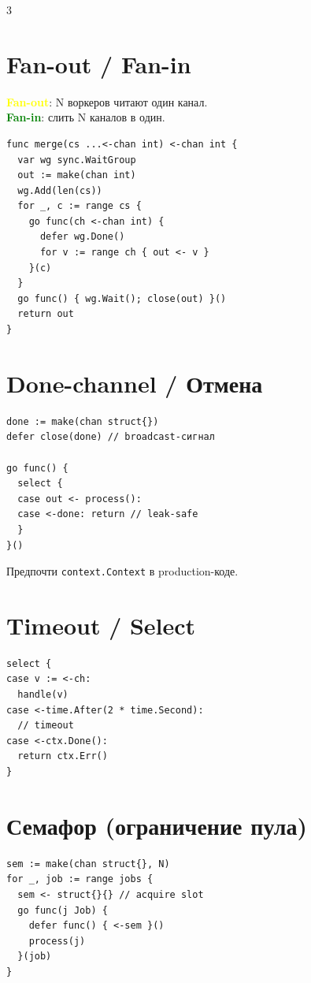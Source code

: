 \documentclass[8.5pt,a4paper]{article}
\newcommand{\hl}[2]{\textbf{\textcolor{#1}{#2}}}
\newcommand{\note}[1]{{\fontsize{6.5}{8}\color{muted} #1}}
\begin{document}
\begin{multicols}{3}
\section{Fan-out / Fan-in}

\hl{yellow}{Fan-out}: N воркеров читают один канал.\\
\hl{green}{Fan-in}: слить N каналов в один.
\begin{lstlisting}
func merge(cs ...<-chan int) <-chan int {
  var wg sync.WaitGroup
  out := make(chan int)
  wg.Add(len(cs))
  for _, c := range cs {
    go func(ch <-chan int) {
      defer wg.Done()
      for v := range ch { out <- v }
    }(c)
  }
  go func() { wg.Wait(); close(out) }()
  return out
}
\end{lstlisting}

\section{Done-channel / Отмена}

\begin{lstlisting}
done := make(chan struct{})
defer close(done) // broadcast-сигнал

go func() {
  select {
  case out <- process():
  case <-done: return // leak-safe
  }
}()
\end{lstlisting}

\note{Предпочти \texttt{context.Context} в production-коде.}

\section{Timeout / Select}

\begin{lstlisting}
select {
case v := <-ch:
  handle(v)
case <-time.After(2 * time.Second):
  // timeout
case <-ctx.Done():
  return ctx.Err()
}
\end{lstlisting}

\section{Семафор (ограничение пула)}

\begin{lstlisting}
sem := make(chan struct{}, N)
for _, job := range jobs {
  sem <- struct{}{} // acquire slot
  go func(j Job) {
    defer func() { <-sem }()
    process(j)
  }(job)
}
\end{lstlisting}


\end{multicols}
\end{document}

